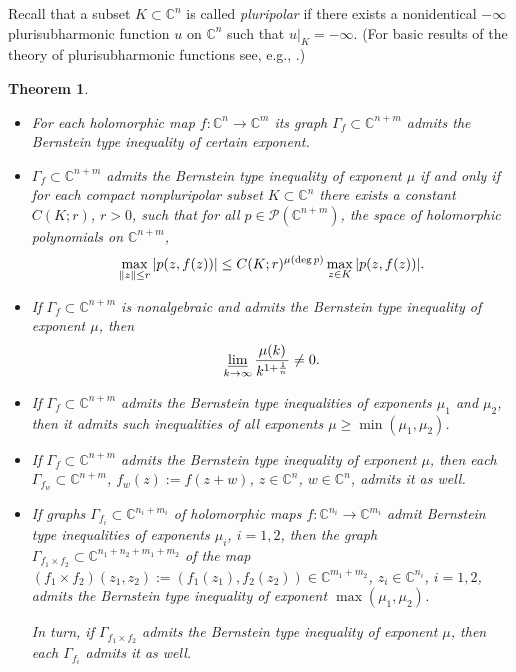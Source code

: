 \documentclass[11pt, oneside]{amsart}
\newtheorem{Th}{Theorem}[section]
\begin{document}
Recall that a subset $K\subset\mathbb C^n$ is called {\em pluripolar} if there exists a nonidentical $-\infty$ plurisubharmonic function $u$ on $\mathbb C^n$ such that 
$u|_{K}=-\infty$. (For basic results of the theory of plurisubharmonic functions see, e.g., \cite{K}.)
\begin{Th}\label{theo1}
\begin{itemize}
\item[(a)]
For each holomorphic map $f:\mathbb C^n\rightarrow\mathbb C^m$ its
graph $\Gamma_f\subset\mathbb C^{n+m}$ admits the Bernstein type inequality of certain exponent.\smallskip
\item[(b)]
$\Gamma_f\subset\mathbb C^{n+m}$ admits the Bernstein type inequality of exponent $\mu$ if and only if for each compact nonpluripolar subset $K\subset\mathbb C^n$ there exists a constant $C(K;r)$, $r>0$, such that for all $p\in\mathcal P(\mathbb C^{n+m})$, the space of holomorphic polynomials on $\mathbb C^{n+m}$,
\begin{equation}\label{e2}
\max_{\|z\|\le r} |p(z,f(z))|\le C(K;r)^{\mu({\rm deg}\,p)} \max_{z\in K} |p(z,f(z))|.\smallskip
\end{equation}
\item[(c)]
If $\Gamma_f\subset\mathbb C^{n+m}$ is nonalgebraic and admits the Bernstein type inequality of exponent $\mu$, then
\[
\varliminf_{k\rightarrow\infty}\frac{\mu(k)}{k^{1+\frac 1n}}\ne 0.\smallskip
\]
\item[(d)]
If $\Gamma_f\subset\mathbb C^{n+m}$ admits the Bernstein type inequalities of exponents $\mu_1$ and $\mu_2$, then it admits such inequalities of all exponents $\mu\ge \min (\mu_1,\mu_2)$.\smallskip
\item[(e)]
If $\Gamma_f\subset\mathbb C^{n+m}$ admits the Bernstein type inequality of exponent $\mu$, then each $\Gamma_{f_w}\subset\mathbb C^{n+m}$, $f_w(z):=f(z+w)$, $z\in\mathbb C^n$, $w\in\mathbb C^n$, admits it as well.\smallskip
\item[(f)]
If graphs $\Gamma_{f_i}\subset\mathbb C^{n_i+m_i}$ of holomorphic maps $f:\mathbb C^{n_i}\rightarrow\mathbb C^{m_i}$
admit Bernstein type inequalities of exponents $\mu_i$, $i=1,2$, then the graph $\Gamma_{f_1\times f_2}\subset \mathbb C^{n_1+n_2+m_1+m_2}$ of the map $(f_1\times f_2)(z_1,z_2):=(f_1(z_1),f_2(z_2))\in\mathbb C^{m_1+m_2}$, $z_i\in\mathbb C^{n_i}$, $i=1,2$, admits the Bernstein type inequality of exponent $\max (\mu_1,\mu_2)$.

\noindent In turn, if $\Gamma_{f_1\times f_2}$ admits the Bernstein type inequality of exponent $\mu$, then each $\Gamma_{f_i}$ admits it as well.
\end{itemize}
\end{Th}
\end{document}
